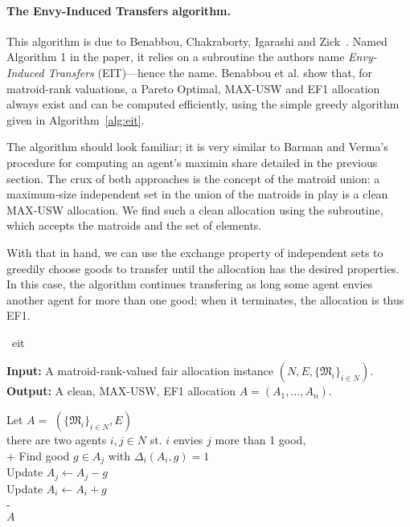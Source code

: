 \paragraph{The Envy-Induced Transfers algorithm.} This algorithm is due to Benabbou, Chakraborty, Igarashi and Zick~\cite{benabbou-2021}. Named Algorithm 1 in the paper, it relies on a subroutine the authors name \textit{Envy-Induced Transfers} (EIT)---hence the name. Benabbou et al. show that, for matroid-rank valuations, a Pareto Optimal, MAX-USW and EF1 allocation always exist and can be computed efficiently, using the simple greedy algorithm given in Algorithm~\ref{alg:eit}.

The algorithm should look familiar; it is very similar to Barman and Verma's procedure for computing an agent's maximin share detailed in the previous section. The crux of both approaches is the concept of the matroid union: a maximum-size independent set in the union of the matroids in play is a clean MAX-USW allocation. We find such a clean allocation using the  subroutine, which accepts the matroids and the set of elements.


With that in hand, we can use the exchange property of independent sets to greedily choose goods to transfer until the allocation has the desired properties. In this case, the algorithm continues transfering as long some agent envies another agent for more than one good; when it terminates, the allocation is thus EF1.

\begin{algorithm}{~\cite{benabbou-2021}}{eit}

\textbf{Input:}  \tab A matroid-rank-valued fair allocation instance $(N, E, \{\mathfrak{M}_i\}_{i\in N})$.\\
\textbf{Output:} \tab A clean, MAX-USW, EF1 allocation $A = (A_1,\dots,A_n)$.

\begin{pseudo}[label=\small\arabic*, indent-mark]
    Let $A =$ $(\{\mathfrak{M}_i\}_{i\in N}, E)$  \\
     there are two agents $i,j\in N$ st. $i$ envies $j$ more than 1 good,   \\+
        Find good $g \in A_j$ with $\Delta_i(A_i, g) = 1$ \\
        Update $A_j \leftarrow A_j - g$ \\
        Update $A_i \leftarrow A_i + g$ \\-
     \\
     $A$
\end{pseudo}
  
\end{algorithm}

